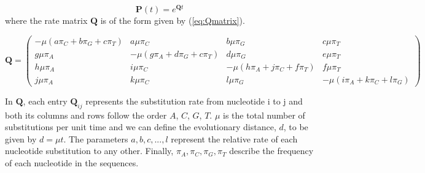 \begin{equation}
\mathbf{P}(t) = e^{\mathbf{Q}t}
\label{eq:probability}
\end{equation}
where the rate matrix $\mathbf{Q}$ is of the form given by (\ref{eq:Qmatrix}).


\begin{footnotesize}
\begin{equation}
\mathbf{Q} = \begin{pmatrix}
-\mu(a\pi_C+b\pi_G + c\pi_T) & a\mu\pi_C & b\mu\pi_G & c\mu\pi_T\\
g\mu\pi_A&-\mu(g\pi_A+d\pi_G + c\pi_T) & d\mu\pi_G & e\mu\pi_T\\
h\mu\pi_A & i\mu\pi_C & -\mu(h\pi_A+j\pi_C + f\pi_T) & f\mu\pi_T\\
j\mu\pi_A & k\mu\pi_C & l\mu\pi_G & -\mu(i\pi_A+k\pi_C + l\pi_G)
\end{pmatrix}
\label{eq:Qmatrix}
\end{equation}
\end{footnotesize}


In $\mathbf{Q}$, each entry $\mathbf{Q}_{ij}$ represents the substitution rate from nucleotide i to j and both its columns and rows follow the order $A$, $C$, $G$, $T$. $\mu$ is the total number of substitutions per unit time and we can define the evolutionary distance, $d$, to be given by $d = \mu t$. The parameters $a, b, c, ..., l$ represent the relative rate of each nucleotide substitution to any other. Finally, $\pi_A, \pi_C, \pi_G, \pi_T$ describe the frequency of each nucleotide in the sequences. 

